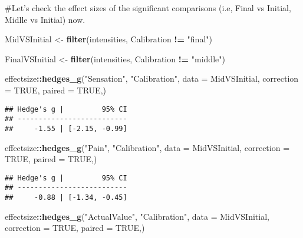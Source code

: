 \documentclass[
]{article}
\newenvironment{Shaded}{\begin{snugshade}}{\end{snugshade}}
\newcommand{\DataTypeTok}[1]{\textcolor[rgb]{0.13,0.29,0.53}{#1}}
\newcommand{\KeywordTok}[1]{\textcolor[rgb]{0.13,0.29,0.53}{\textbf{#1}}}
\newcommand{\NormalTok}[1]{#1}
\newcommand{\OperatorTok}[1]{\textcolor[rgb]{0.81,0.36,0.00}{\textbf{#1}}}
\newcommand{\OtherTok}[1]{\textcolor[rgb]{0.56,0.35,0.01}{#1}}
\newcommand{\StringTok}[1]{\textcolor[rgb]{0.31,0.60,0.02}{#1}}
\begin{document}
\#Let's check the effect sizes of the significant comparisons (i.e,
Final vs Initial, Midlle vs Initial) now.

\begin{Shaded}
\begin{Highlighting}[]
\NormalTok{MidVSInitial <-}\StringTok{ }\KeywordTok{filter}\NormalTok{(intensities, Calibration }\OperatorTok{!=}\StringTok{ "final"}\NormalTok{)}

\NormalTok{FinalVSInitial <-}\StringTok{ }\KeywordTok{filter}\NormalTok{(intensities, Calibration }\OperatorTok{!=}\StringTok{ "middle"}\NormalTok{)}

\NormalTok{effectsize}\OperatorTok{::}\KeywordTok{hedges_g}\NormalTok{(}\StringTok{"Sensation"}\NormalTok{, }\StringTok{"Calibration"}\NormalTok{, }\DataTypeTok{data =}\NormalTok{ MidVSInitial, }\DataTypeTok{correction =} \OtherTok{TRUE}\NormalTok{, }\DataTypeTok{paired =} \OtherTok{TRUE}\NormalTok{,)}
\end{Highlighting}
\end{Shaded}

\begin{verbatim}
## Hedge's g |         95% CI
## --------------------------
##     -1.55 | [-2.15, -0.99]
\end{verbatim}

\begin{Shaded}
\begin{Highlighting}[]
\NormalTok{effectsize}\OperatorTok{::}\KeywordTok{hedges_g}\NormalTok{(}\StringTok{"Pain"}\NormalTok{, }\StringTok{"Calibration"}\NormalTok{, }\DataTypeTok{data =}\NormalTok{ MidVSInitial, }\DataTypeTok{correction =} \OtherTok{TRUE}\NormalTok{, }\DataTypeTok{paired =} \OtherTok{TRUE}\NormalTok{,)}
\end{Highlighting}
\end{Shaded}

\begin{verbatim}
## Hedge's g |         95% CI
## --------------------------
##     -0.88 | [-1.34, -0.45]
\end{verbatim}

\begin{Shaded}
\begin{Highlighting}[]
\NormalTok{effectsize}\OperatorTok{::}\KeywordTok{hedges_g}\NormalTok{(}\StringTok{"ActualValue"}\NormalTok{, }\StringTok{"Calibration"}\NormalTok{, }\DataTypeTok{data =}\NormalTok{ MidVSInitial, }\DataTypeTok{correction =} \OtherTok{TRUE}\NormalTok{, }\DataTypeTok{paired =} \OtherTok{TRUE}\NormalTok{,)}
\end{Highlighting}
\end{Shaded}
\end{document}
